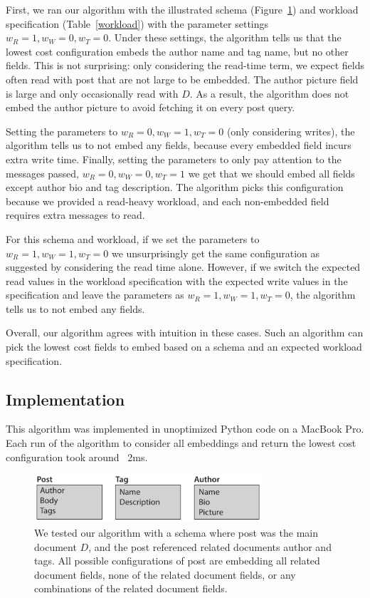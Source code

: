 First, we ran our algorithm with the illustrated schema (Figure~\ref{fig:schema}) and workload specification (Table~\ref{workload}) with the parameter settings $w_R = 1, w_W = 0, w_T = 0$. Under these settings, the algorithm tells us that the lowest cost configuration embeds the author name and tag name, but no other fields. 
This is not surprising: only considering the read-time term, we expect fields often read with post that are not large to be embedded. 
The author picture field is large and only occasionally read with $D$.
As a result, the algorithm does not embed the author picture to avoid fetching it on every post query.

Setting the parameters to $w_R = 0, w_W = 1, w_T = 0$ (only considering writes), the algorithm tells us to not embed any fields, because every embedded field incurs extra write time.
Finally, setting the parameters to only pay attention to the messages passed, $w_R = 0, w_W = 0, w_T = 1$ we get that we should embed all fields except author bio and tag description. 
The algorithm picks this configuration because we provided a read-heavy workload, and each non-embedded field requires extra messages to read. 

For this schema and workload, if we set the parameters to $w_R = 1, w_W = 1, w_T = 0$ we unsurprisingly get the same configuration as suggested by considering the read time alone. 
However, if we switch the expected read values in the workload specification with the expected write values in the specification and leave the parameters as  $w_R = 1, w_W = 1, w_T = 0$, the algorithm tells us to not embed any fields. 

Overall, our algorithm agrees with intuition in these cases. Such an algorithm can pick the lowest cost fields to embed based on a schema and an expected workload specification.

\subsection{Implementation}
This algorithm was implemented in unoptimized Python code on a MacBook Pro. Each run of the algorithm to consider all embeddings and return the lowest cost configuration took around ~2ms.

\begin{figure}[t]
\centering
\includegraphics[width=3.33in]{figures/algorithm-schema.pdf}
\caption{We tested our algorithm with a schema where post was the main document $D$, and the post referenced related documents author and tags. All possible configurations of post are embedding all related document fields, none of the related document fields, or any combinations of the related document fields.}
\label{fig:schema}
\end{figure}


